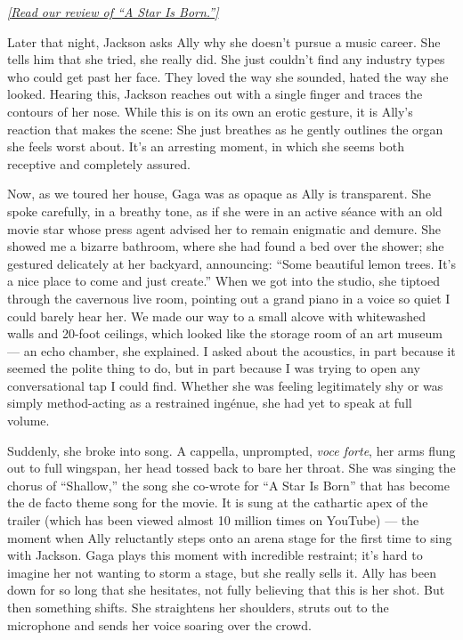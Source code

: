 \emph{\href{https://www.nytimes3xbfgragh.onion/2018/10/03/movies/a-star-is-born-review-lady-gaga-bradley-cooper.html}{{[}Read
our review of ``A Star Is Born.''{]}}}

Later that night, Jackson asks Ally why she doesn't pursue a music
career. She tells him that she tried, she really did. She just couldn't
find any industry types who could get past her face. They loved the way
she sounded, hated the way she looked. Hearing this, Jackson reaches out
with a single finger and traces the contours of her nose. While this is
on its own an erotic gesture, it is Ally's reaction that makes the
scene: She just breathes as he gently outlines the organ she feels worst
about. It's an arresting moment, in which she seems both receptive and
completely assured.

Now, as we toured her house, Gaga was as opaque as Ally is transparent.
She spoke carefully, in a breathy tone, as if she were in an active
séance with an old movie star whose press agent advised her to remain
enigmatic and demure. She showed me a bizarre bathroom, where she had
found a bed over the shower; she gestured delicately at her backyard,
announcing: ``Some beautiful lemon trees. It's a nice place to come and
just create.'' When we got into the studio, she tiptoed through the
cavernous live room, pointing out a grand piano in a voice so quiet I
could barely hear her. We made our way to a small alcove with
whitewashed walls and 20-foot ceilings, which looked like the storage
room of an art museum --- an echo chamber, she explained. I asked about
the acoustics, in part because it seemed the polite thing to do, but in
part because I was trying to open any conversational tap I could find.
Whether she was feeling legitimately shy or was simply method-acting as
a restrained ingénue, she had yet to speak at full volume.

Suddenly, she broke into song. A cappella, unprompted, \emph{voce
forte}, her arms flung out to full wingspan, her head tossed back to
bare her throat. She was singing the chorus of ``Shallow,'' the song she
co-wrote for ``A Star Is Born'' that has become the de facto theme song
for the movie. It is sung at the cathartic apex of the trailer (which
has been viewed almost 10 million times on YouTube) --- the moment when
Ally reluctantly steps onto an arena stage for the first time to sing
with Jackson. Gaga plays this moment with incredible restraint; it's
hard to imagine her not wanting to storm a stage, but she really sells
it. Ally has been down for so long that she hesitates, not fully
believing that this is her shot. But then something shifts. She
straightens her shoulders, struts out to the microphone and sends her
voice soaring over the crowd.


